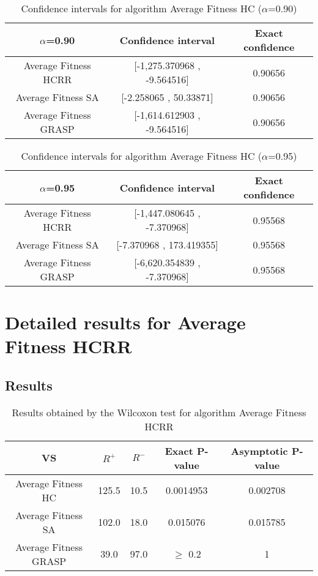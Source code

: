 \documentclass[a4paper,10pt]{article}
\begin{document}
\begin{table}[!htp]
\centering\small
\begin{tabular}{
|c|c|c|}
\hline
 $\alpha$=0.90 & Confidence interval & Exact confidence \\ \hline 
Average Fitness HCRR    & [-1,275.370968 , -9.564516] & 0.90656\\ \hline 
Average Fitness SA      & [-2.258065 , 50.33871] & 0.90656\\ \hline 
Average Fitness GRASP & [-1,614.612903 , -9.564516] & 0.90656\\ \hline 

\end{tabular}
\caption{Confidence intervals for algorithm Average Fitness HC       ($\alpha$=0.90)}
\end{table}
\begin{table}[!htp]
\centering\small
\begin{tabular}{
|c|c|c|}
\hline
 $\alpha$=0.95 & Confidence interval & Exact confidence \\ \hline 
Average Fitness HCRR    & [-1,447.080645 , -7.370968] & 0.95568\\ \hline 
Average Fitness SA      & [-7.370968 , 173.419355] & 0.95568\\ \hline 
Average Fitness GRASP & [-6,620.354839 , -7.370968] & 0.95568\\ \hline 

\end{tabular}
\caption{Confidence intervals for algorithm Average Fitness HC       ($\alpha$=0.95)}
\end{table}

 \clearpage 


\section{Detailed results for Average Fitness HCRR   }


\subsection{Results}

\begin{table}[!htp]
\centering\small
\begin{tabular}{
|c|c|c|c|c|}
\hline
 VS & $R^{+}$ & $R^{-}$ & Exact P-value & Asymptotic P-value \\ \hline 
Average Fitness HC       & 125.5 & 10.5 & 0.0014953 & 0.002708\\ \hline 
Average Fitness SA      & 102.0 & 18.0 & 0.015076 & 0.015785\\ \hline 
Average Fitness GRASP & 39.0 & 97.0 & $\geq$ 0.2 & 1\\ \hline 

\end{tabular}
\caption{Results obtained by the Wilcoxon test for algorithm Average Fitness HCRR   }
\end{table}
\end{document}
